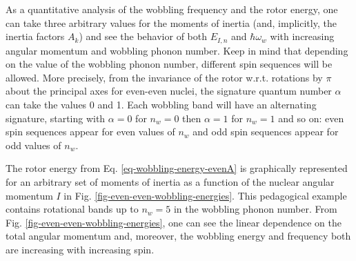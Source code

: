 
As a quantitative analysis of the wobbling frequency and the rotor energy, one can take three arbitrary values for the moments of inertia (and, implicitly, the inertia factors $A_k$) and see the behavior of both $E_{I,n}$ and $\hbar\omega_w$ with increasing angular momentum and wobbling phonon number. Keep in mind that depending on the value of the wobbling phonon number, different spin sequences will be allowed. More precisely, from the invariance of the rotor w.r.t. rotations by $\pi$ about the principal axes for even-even nuclei, the signature quantum number $\alpha$ can take the values 0 and 1. Each wobbling band will have an alternating signature, starting with $\alpha=0$ for $n_w=0$ then $\alpha=1$ for $n_w=1$ and so on: even spin sequences appear for even values of $n_w$ and odd spin sequences appear for odd values of $n_w$.

The rotor energy from Eq. \ref{eq-wobbling-energy-evenA} is graphically represented for an arbitrary set of moments of inertia as a function of the nuclear angular momentum $I$ in Fig. \ref{fig-even-even-wobbling-energies}. This pedagogical example contains rotational bands up to $n_w=5$ in the wobbling phonon number. From Fig. \ref{fig-even-even-wobbling-energies}, one can see the linear dependence on the total angular momentum and, moreover, the wobbling energy and frequency both are increasing with increasing spin.

